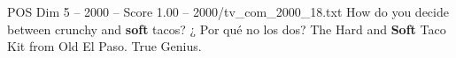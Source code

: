\begin{textsample}{POS Dim 5 – 2000 – Score 1.00 – 2000/tv\_com\_2000\_18.txt}  \label{ex:f5_pos_064}
How do you decide between crunchy and \textbf{soft} tacos? ¿ Por qué no los dos?
The Hard and \textbf{Soft} Taco Kit from Old El Paso.
True Genius.

\end{textsample}
